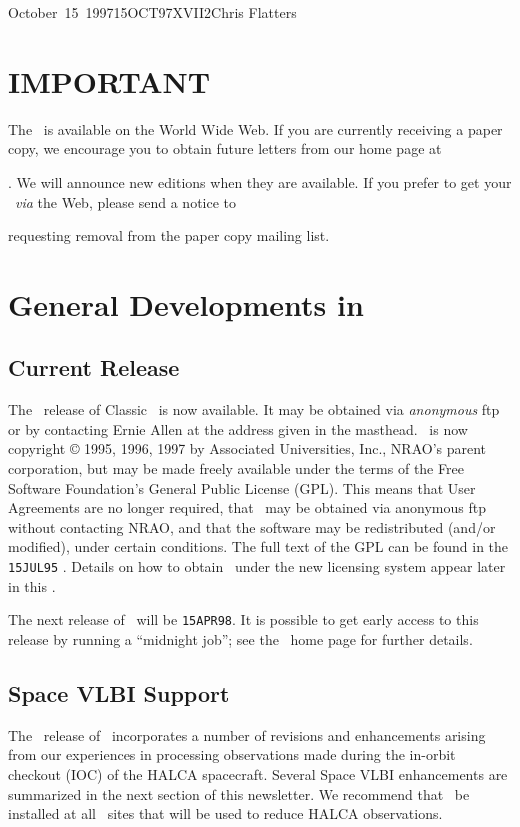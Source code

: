 \documentclass[twoside]{article}
\begin{document}
\begin{aipsletter}{October~15~1997}{15OCT97}{XVII}{2}{Chris Flatters}

\section{IMPORTANT}

The \AIPSLetter\ is available on the World Wide Web. If you are
currently receiving a paper copy, we encourage you to obtain future
letters from our home page at
\address{http://www.cv.nrao.edu/aips/}. We will announce new editions
when they are available. If you prefer to get your \AIPSLetter\
\emph{via} the Web, please send a notice to
\address{aipsmail@nrao.edu} requesting removal from the paper copy
mailing list.

\section{General Developments in \AIPS}

\subsection{Current Release}

The \thisrelease\ release of Classic \AIPS\ is now available.  It may
be obtained via \emph{anonymous} ftp or by contacting Ernie Allen at
the address given in the masthead.  \AIPS\ is now copyright \copyright
1995, 1996, 1997 by Associated Universities, Inc., NRAO's parent
corporation, but may be made freely available under the terms of the
Free Software Foundation's General Public License \hbox{(GPL)}.  This
means that User Agreements are no longer required, that \AIPS\ may be
obtained via anonymous ftp without contacting NRAO, and that the
software may be redistributed (and/or modified), under certain
conditions.  The full text of the GPL can be found in the
\texttt{15JUL95} \AIPSLetter. Details on how to obtain \AIPS\ under the new
licensing system appear later in this \AIPSLetter.

The next release of \AIPS\ will be \texttt{15APR98}.  It is possible
to get early access to this release by running a ``midnight job''; see
the \AIPS\ home page for further details.

\subsection{Space VLBI Support}

The \thisrelease\ release of \AIPS\ incorporates a number of revisions
and enhancements arising from our experiences in processing
observations made during the in-orbit checkout (IOC) of the HALCA
spacecraft.  Several Space VLBI enhancements are summarized in the
next section of this newsletter.  We recommend that \thisrelease\ be
installed at all \AIPS\ sites that will be used to reduce HALCA
observations.


\end{aipsletter}
\end{document}
